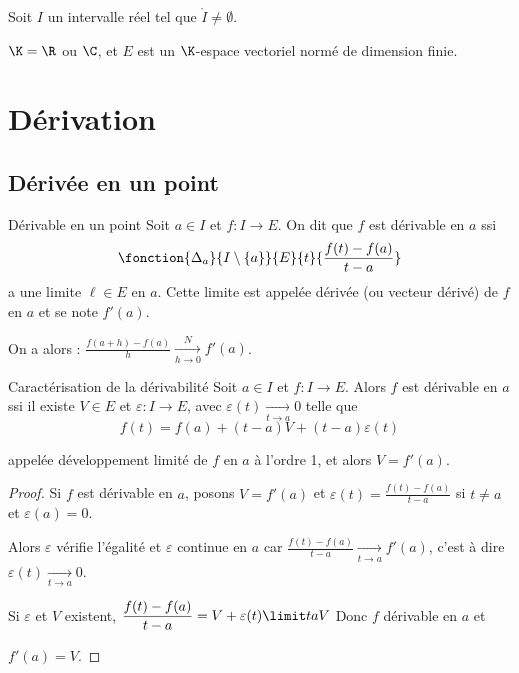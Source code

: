 Soit $I$ un intervalle réel tel que $\mathring{I} \neq \emptyset$.

$\K = \R$ ou $\C$, et $E$ est un $\K$-espace vectoriel normé
 de dimension finie.


\section{Dérivation }
\subsection{Dérivée en un point}

\begin{definition}{Dérivable en un point}{}
    Soit $a \in I$ et $f: I \to E$. On dit que $f$ est dérivable en $a$ ssi 
    \[\fonction{\Delta_a}{I \setminus \{a\}}{E}{t}{\frac{f(t) - f(a)}{t-a}}\]
    a une limite $\ell \in E$ en $a$. Cette limite est appelée dérivée (ou vecteur dérivé)
    de $f$ en $a$ et se note $f'(a)$.

    On a alors : $\displaystyle \frac{f(a + h ) - f(a)}{h} \xrightarrow[h \to 0]{N} f'(a)$.
\end{definition}

\begin{proposition}{Caractérisation de la dérivabilité}{}
    Soit $a \in I$ et $f: I \to E$. Alors $f$ est dérivable en $a$ ssi il existe $V \in E$
    et $\varepsilon : I \to E$, avec $\varepsilon(t) \xrightarrow[t \to a]{} 0$ telle que
    \[f(t) = f(a) + (t-a)V + (t-a)\varepsilon(t)\]

    appelée développement limité de $f$ en $a$ à l'ordre 1, et alors $V = f'(a)$.
\end{proposition}

\begin{proof}
    Si $f$ est dérivable en $a$, posons $V = f'(a)$ et $\varepsilon(t) = \frac{f(t) - f(a)}{t - a }$ si 
    $t \neq a$ et $\varepsilon(a) = 0$. 

    Alors $\varepsilon$ vérifie l'égalité et $\varepsilon$ continue en $a$ car 
    $\displaystyle \frac{f(t) - f(a)}{t-a} \xrightarrow[t \to a]{} f'(a)$, c'est à dire 
    $\varepsilon(t) \xrightarrow[t \to a]{} 0$.


    \svspace Si $\varepsilon$ et $V$ existent, $\displaystyle \frac{f(t) - f(a)}{t-a} = V + \varepsilon(t) \limit t a V$
    Donc $f$ dérivable en $a$ et 
    
    $f'(a) = V$.
\end{proof}


